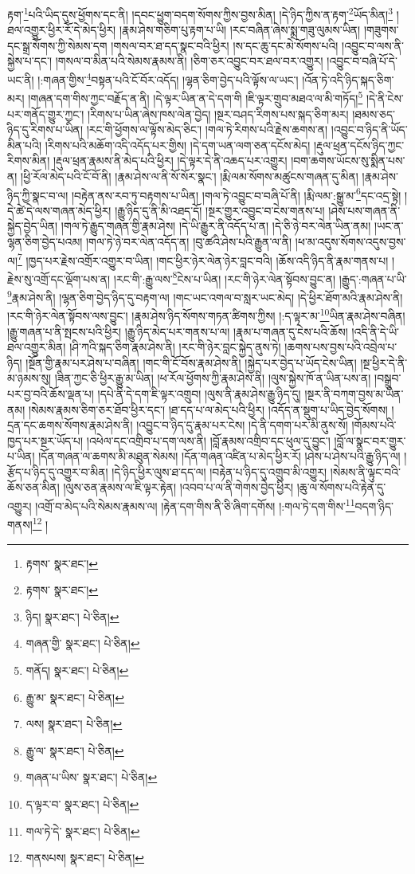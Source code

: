 རྟག་\footnote{རྟགས་  སྣར་ཐང་། }པའི་ཡིད་དུས་ཕྱོགས་དང་ནི། །དབང་ཕྱུག་བདག་སོགས་ཀྱིས་བྱས་མིན། །དེ་ཉིད་ཀྱིས་ན་རྟག་\footnote{རྟགས་  སྣར་ཐང་། }ཡོད་མིན།\footnote{ཉིད།  སྣར་ཐང་།  པེ་ཅིན། } །ཐལ་འགྱུར་ཕྱིར་རོ་དེ་མེད་ཕྱིར། །རྣམ་ཤེས་གཅིག་པུ་རྟག་པ་ཡི། །རང་བཞིན་ཞེས་སྨྲ་གཟུ་ལུམས་ཡིན། །གཟུགས་དང་སྒྲ་སོགས་ཀྱི་སེམས་དག །གསལ་བར་ཐ་དད་སྣང་བའི་ཕྱིར། །ས་དང་ཆུ་དང་མེ་སོགས་པའི། །འབྱུང་བ་ལས་ནི་སྐྱེས་པ་དང་། །གསལ་བ་མིན་པའི་སེམས་རྣམས་ནི། །ཅིག་ཅར་འབྱུང་བར་ཐལ་བར་འགྱུར། །འབྱུང་བ་བཞི་པོ་དེ་ཡང་ནི། །:གཞན་གྱིས་\footnote{གཞན་གྱི་  སྣར་ཐང་།  པེ་ཅིན། }བསྟན་པའི་ངོ་བོར་འདོད། །ལྷན་ཅིག་བྱེད་པའི་ལྟོས་ལ་ཡང་། །འོན་ཏེ་འདི་ཉིད་སྐད་ཅིག་མར། །གཞན་དག་གིས་ཀྱང་བརྗོད་ན་ནི། །དེ་ལྟར་ཡིན་ན་དེ་དག་གི །ཇི་ལྟར་གྲུབ་མཐའ་ལ་མི་གཏོད།\footnote{གནོད།  སྣར་ཐང་།  པེ་ཅིན། } །དེ་ནི་ངེས་པར་གནོད་གྱུར་ཀྱང་། །རིགས་པ་ཡིན་ཞེས་ཁས་ལེན་བྱེད། །སྔར་བཤད་རིགས་པས་སྐད་ཅིག་མར། །ཐམས་ཅད་ཉིད་དུ་རིགས་པ་ཡིན། །རང་གི་ཕྱོགས་ལ་ལྟོས་མེད་ཅིང་། །གལ་ཏེ་རིགས་པའི་རྗེས་ཆགས་ན། །འབྱུང་བ་ཉིད་ནི་ཡོད་མིན་པའི། །རིགས་པའི་མཆོག་འདི་འདོད་པར་གྱིས། །དེ་དག་ཡན་ལག་ཅན་དངོས་མེད། །རྡུལ་ཕྲན་དངོས་ཉིད་ཀྱང་རིགས་མིན། །རྡུལ་ཕྲན་རྣམས་ནི་མེད་པའི་ཕྱིར། །དེ་ལྟར་དེ་ནི་འཆད་པར་འགྱུར། །བག་ཆགས་ཡོངས་སུ་སྨིན་པས་ན། །ཕྱི་རོལ་མེད་པའི་ངོ་བོ་ནི། །རྣམ་ཤེས་ལ་ནི་སོ་སོར་སྣང་། །རྨི་ལམ་སོགས་མཚུངས་གཞན་དུ་མིན། །རྣམ་ཤེས་ཉིད་ཀྱི་སྣང་བ་ལ། །བརྟེན་ནས་རབ་ཏུ་བརྟགས་པ་ཡིན། །གལ་ཏེ་འབྱུང་བ་བཞི་པོ་ནི། །རྨི་ལམ་:སྒྱུ་མ་\footnote{རྒྱུ་མ་  སྣར་ཐང་།  པེ་ཅིན། }དང་འདྲ་སྟེ། །དེ་ཚེ་དེ་ལས་གཞན་མེད་ཕྱིར། །རྒྱུ་ཉིད་དུ་ནི་མི་འཐད་དོ། །སྔར་གྱུར་འབྱུང་བ་ངེས་གནས་པ། །ཤེས་པས་གཞན་ནི་སྐྱེད་བྱེད་ཡིན། །གལ་ཏེ་རྒྱུད་གཞན་གྱི་རྣམ་ཤེས། །དེ་ཡི་རྒྱུར་ནི་འདོད་པ་ན། །དེ་ཅི་ཉེ་བར་ལེན་ཡིན་ནམ། །ཡང་ན་ལྷན་ཅིག་བྱེད་པའམ། །གལ་ཏེ་ཉེ་བར་ལེན་འདོད་ན། །བུ་ཚའི་ཤེས་པའི་རྒྱུན་ལ་ནི། །ཕ་མ་འདུས་སོགས་འདུས་བྱས་ལ།\footnote{ལས།  སྣར་ཐང་།  པེ་ཅིན། } །ཁྱད་པར་རྗེས་འགྲོར་འགྱུར་བ་ཡིན། །གང་ཕྱིར་ཉེར་ལེན་ཉེར་བླང་བའི། །ཆོས་འདི་ཉིད་ནི་རྣམ་གནས་པ། །
རྗེས་སུ་འགྲོ་དང་ལྡོག་པས་ན། །རང་གི་:རྒྱུ་ལས་\footnote{རྒྱུ་ལ་  སྣར་ཐང་།  པེ་ཅིན། }ངེས་པ་ཡིན། །རང་གི་ཉེར་ལེན་སྟོབས་བྱུང་ན། །རྒྱུད་:གཞན་པ་ཡི་\footnote{གཞན་པ་ཡིས་  སྣར་ཐང་།  པེ་ཅིན། }རྣམ་ཤེས་ནི། །ལྷན་ཅིག་བྱེད་ཉིད་དུ་བརྟག་ལ། །གང་ཡང་འགལ་བ་སླར་ཡང་མེད། །དེ་ཕྱིར་ཐོག་མའི་རྣམ་ཤེས་ནི། །རང་གི་ཉེར་ལེན་སྟོབས་ལས་བྱུང་། །རྣམ་ཤེས་ཉིད་སོགས་གཏན་ཚིགས་ཀྱིས། །:ད་ལྟར་མ་\footnote{ད་ལྟར་བ་  སྣར་ཐང་།  པེ་ཅིན། }ཡིན་རྣམ་ཤེས་བཞིན། །རྒྱུ་གཞན་པ་ནི་སྤངས་པའི་ཕྱིར། །རྒྱུ་ཉིད་མེད་པར་གནས་པ་ལ། །རྣམ་པ་གཞན་དུ་ངེས་པའི་ཆོས། །འདི་ནི་དེ་ཡི་ཐལ་འགྱུར་མིན། །ཤི་ཀའི་སྐད་ཅིག་རྣམ་ཤེས་ནི། །རང་གི་ཉེར་བླང་སྐྱེད་ནུས་ཏེ། །ཆགས་པས་བྱས་པའི་འབྲེལ་པ་ཉིད། །སྔོན་གྱི་རྣམ་པར་ཤེས་པ་བཞིན། །གང་གི་ངོ་བོས་རྣམ་ཤེས་ནི། །སྐྱེད་པར་བྱེད་པ་ཡོད་ངེས་ཡིན། །སྔ་ཕྱིར་དེ་ནི་མ་ཉམས་སུ། །ཟིན་ཀྱང་ཅི་ཕྱིར་རྒྱུ་མ་ཡིན། །ཕ་རོལ་ཕྱོགས་ཀྱི་རྣམ་ཤེས་ནི། །ལུས་སྐྱེས་ཁོ་ན་ཡིན་པས་ན། །བསྒྲུབ་པར་བྱ་བའི་ཆོས་ལྡན་པ། །དཔེ་ནི་དེ་དག་ཇི་ལྟར་འགྲུབ། །ལུས་ནི་རྣམ་ཤེས་རྒྱུ་ཉིད་དུ། །སྔར་ནི་བཀག་བྱས་མ་ཡིན་ནམ། །སེམས་རྣམས་ཅིག་ཅར་ཐོབ་ཕྱིར་དང་། །ཐ་དད་པ་ལ་མེད་པའི་ཕྱིར། །འདོད་ན་སྡུག་པ་ཡིད་བྱེད་སོགས། །དྲན་དང་ཆགས་སོགས་རྣམ་ཤེས་ནི། །འབྱུང་བ་ཉིད་དུ་རྣམ་པར་ངེས། །དེ་ནི་དགག་པར་མི་ནུས་སོ། །གོམས་པའི་ཁྱད་པར་སྔར་ཡོད་པ། །འཕེལ་དང་འགྲིབ་པ་དག་ལས་ནི། །བློ་རྣམས་འགྲིབ་དང་ཕུལ་དུ་བྱུང་། །བློ་ལ་སྣང་བར་གྱུར་པ་ཡིན། །དོན་གཞན་ལ་ཆགས་མི་མཐུན་སེམས། །དོན་གཞན་འཛིན་པ་མེད་ཕྱིར་རོ། །ཤེས་པ་ཤེས་པའི་རྒྱུ་ཉིད་ལ། །རྩོད་པ་ཉིད་དུ་འགྱུར་བ་མིན། །དེ་ཉིད་ཕྱིར་ལུས་ཐ་དད་ལ། །བརྟེན་པ་ཉིད་དུ་འགྲུབ་མི་འགྱུར། །སེམས་ནི་ལྟུང་བའི་ཆོས་ཅན་མིན། །ལུས་ཅན་རྣམས་ལ་ཇི་ལྟར་རྟེན། །འབབ་པ་ལ་ནི་གེགས་བྱེད་ཕྱིར། །ཆུ་ལ་སོགས་པའི་རྟེན་དུ་འགྱུར། །འགྲོ་བ་མེད་པའི་སེམས་རྣམས་ལ། །རྟེན་དག་གིས་ནི་ཅི་ཞིག་དགོས། །:གལ་ཏེ་དག་གིས་\footnote{གལ་ཏེ་དེ་  སྣར་ཐང་།  པེ་ཅིན། }བདག་ཉིད་གནས།\footnote{གནསཔས།  སྣར་ཐང་།  པེ་ཅིན། } །
